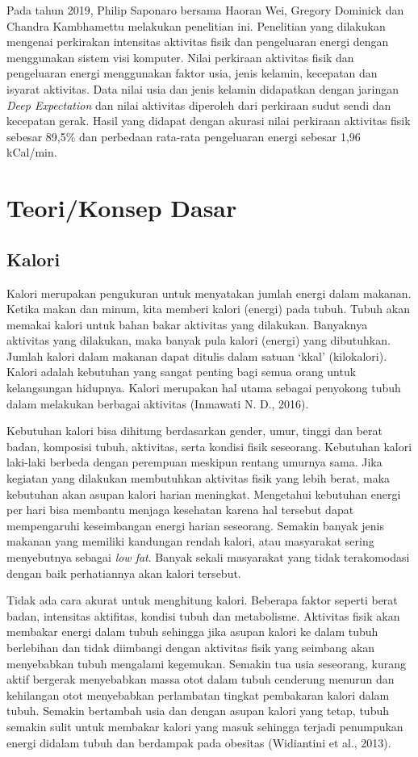 Pada tahun 2019, Philip Saponaro bersama Haoran Wei, Gregory Dominick dan Chandra Kambhamettu melakukan penelitian ini. Penelitian yang dilakukan mengenai perkirakan intensitas aktivitas fisik dan pengeluaran energi dengan menggunakan sistem visi komputer. Nilai perkiraan aktivitas fisik dan pengeluaran energi menggunakan faktor usia, jenis kelamin, kecepatan dan isyarat aktivitas. Data nilai usia dan jenis kelamin didapatkan dengan jaringan \emph{Deep Expectation} dan nilai aktivitas diperoleh dari perkiraan sudut sendi dan kecepatan gerak. Hasil yang didapat dengan akurasi nilai perkiraan aktivitas fisik sebesar 89,5\% dan perbedaan rata-rata pengeluaran energi sebesar 1,96 kCal/min.


\section{Teori/Konsep Dasar}

\subsection{Kalori}

Kalori merupakan pengukuran untuk menyatakan jumlah energi dalam makanan. Ketika makan dan minum, kita memberi kalori (energi) pada tubuh. Tubuh akan memakai kalori untuk bahan bakar aktivitas yang dilakukan. Banyaknya aktivitas yang dilakukan, maka banyak pula kalori (energi) yang dibutuhkan. Jumlah kalori dalam makanan dapat ditulis dalam satuan ‘kkal’ (kilokalori). Kalori adalah kebutuhan yang sangat penting bagi semua orang untuk kelangsungan hidupnya. Kalori merupakan hal utama sebagai penyokong tubuh dalam melakukan berbagai aktivitas (Inmawati N. D., 2016). 

Kebutuhan kalori bisa dihitung berdasarkan gender, umur, tinggi dan berat badan, komposisi tubuh, aktivitas, serta kondisi fisik seseorang. Kebutuhan kalori laki-laki berbeda dengan perempuan meskipun rentang umurnya sama. Jika kegiatan yang dilakukan membutuhkan aktivitas fisik yang lebih berat, maka kebutuhan akan asupan kalori harian meningkat. Mengetahui kebutuhan energi per hari bisa membantu menjaga kesehatan karena hal tersebut dapat mempengaruhi keseimbangan energi harian seseorang. Semakin banyak jenis makanan yang memiliki kandungan rendah kalori, atau masyarakat sering menyebutnya sebagai \emph{low fat}. Banyak sekali masyarakat yang tidak terakomodasi dengan baik perhatiannya akan kalori tersebut.

Tidak ada cara akurat untuk menghitung kalori. Beberapa faktor seperti berat badan, intensitas aktifitas, kondisi tubuh dan metabolisme. Aktivitas fisik akan membakar energi dalam tubuh sehingga jika asupan kalori ke dalam tubuh berlebihan dan tidak diimbangi dengan aktivitas fisik yang seimbang akan menyebabkan tubuh mengalami kegemukan. Semakin tua usia seseorang, kurang aktif bergerak menyebabkan massa otot dalam tubuh cenderung menurun dan kehilangan otot menyebabkan perlambatan tingkat pembakaran kalori dalam tubuh. Semakin bertambah usia dan dengan asupan kalori yang tetap, tubuh semakin sulit untuk membakar kalori yang masuk sehingga terjadi penumpukan energi didalam tubuh dan berdampak pada obesitas (Widiantini et al., 2013).

